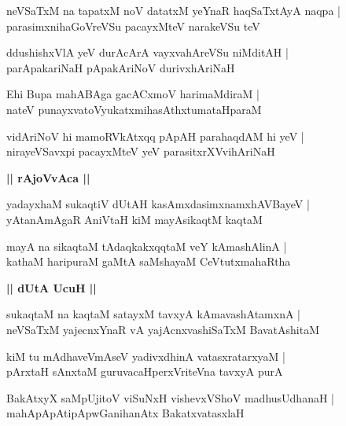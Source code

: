 \documentclass[twoside,12pt,openright]{book}
\newcounter{shloka}[chapter]
\def\uvaca#1{\centerline{{\large\textbf{#1}}}}
\begin{document}
\begin{shloka}%
neVSaTxM na tapatxM noV datatxM yeYnaR haqSaTxtAyA naqpa |\\
parasimxnihaGoVreVSu pacayxMteV narakeVSu teV 
\end{shloka}

\begin{shloka}%
ddushishxVlA yeV durAcArA vayxvahAreVSu niMditAH |\\
parApakariNaH pApakAriNoV durivxhAriNaH
\end{shloka}

\begin{shloka}%
Ehi Bupa mahABAga gacACxmoV harimaMdiraM |\\
nateV punayxvatoVyukatxmihasAthxtumataHparaM 
\end{shloka}

\begin{shloka}%
vidAriNoV hi mamoRVkAtxqq pApAH parahaqdAM hi yeV |\\
nirayeVSavxpi pacayxMteV yeV parasitxrXVvihAriNaH 
\end{shloka}

\uvaca{|| rAjoVvAca ||}

\begin{shloka}%
yadayxhaM sukaqtiV dUtAH kasAmxdasimxnamxhAVBayeV |\\
yAtanAmAgaR AniVtaH kiM mayAsikaqtM kaqtaM 
\end{shloka}

\begin{shloka}%
mayA na sikaqtaM tAdaqkakxqqtaM veY kAmashAlinA |\\
kathaM haripuraM gaMtA saMshayaM CeVtutxmahaRtha
\end{shloka}

\uvaca{|| dUtA UcuH ||}

\begin{shloka}%
sukaqtaM na kaqtaM satayxM tavxyA kAmavashAtamxnA |\\
neVSaTxM yajecnxYnaR vA yajAcnxvashiSaTxM BavatAshitaM 
\end{shloka}

\begin{shloka}%
kiM tu mAdhaveVmAseV yadivxdhinA vatasxratarxyaM |\\
pArxtaH sAnxtaM guruvacaHperxVriteVna tavxyA purA 
\end{shloka}

\begin{shloka}%
BakAtxyX saMpUjitoV viSuNxH vishevxVShoV madhusUdhanaH |\\
mahApApAtipApwGanihanAtx BakatxvatasxlaH
\end{shloka}
\end{document}
